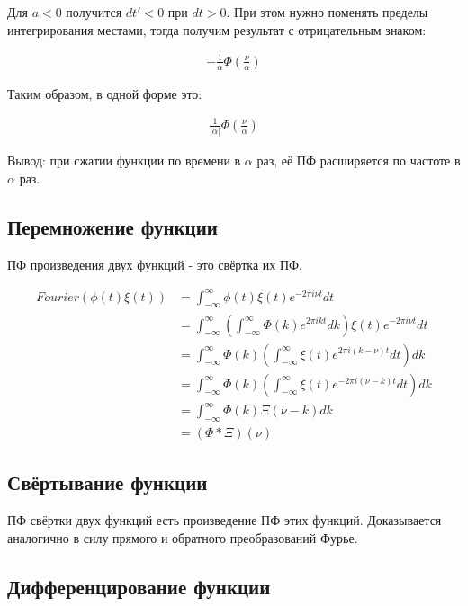 \documentclass[a4paper,12pt]{report}
\begin{document}
Для $a < 0$ получится $dt' < 0$ при $dt > 0$. При этом нужно поменять пределы интегрирования местами, тогда получим результат с отрицательным знаком:

\[
    \begin{aligned}
        -\frac{1}{\alpha} \Phi\left(\frac{\nu}{\alpha}\right)
    \end{aligned}
\]

Таким образом, в одной форме это:

\[
    \begin{aligned}
        \frac{1}{\left|\alpha\right|} \Phi\left(\frac{\nu}{\alpha}\right)
    \end{aligned}
\]

Вывод: при сжатии функции по времени в $\alpha$ раз, её ПФ расширяется по частоте в $\alpha$ раз.

\subsection{Перемножение функции}

ПФ произведения двух функций - это свёртка их ПФ.

\[
    \begin{aligned}
        Fourier\left(\phi(t)\xi(t)\right) 
        &= \int_{-\infty}^{\infty} \phi(t)\xi(t) e^{-2\pi i\nu t} dt \\
        &= \int_{-\infty}^{\infty} \left( \int_{-\infty}^{\infty} \Phi(k) e^{2\pi i kt} dk \right) \xi(t) e^{-2\pi i\nu t} dt \\
        &= \int_{-\infty}^{\infty} \Phi(k) \left( \int_{-\infty}^{\infty} \xi(t) e^{2\pi i (k - \nu)t} dt \right) dk \\
        &= \int_{-\infty}^{\infty} \Phi(k) \left( \int_{-\infty}^{\infty} \xi(t) e^{-2\pi i (\nu - k)t} dt \right) dk \\
        &= \int_{-\infty}^{\infty} \Phi(k) \Xi(\nu - k) dk \\
        &= \left(\Phi * \Xi\right)(\nu)
    \end{aligned}
\]

\subsection{Свёртывание функции}
ПФ свёртки двух функций есть произведение ПФ этих функций. Доказывается аналогично в силу  прямого и обратного преобразований Фурье.

\subsection{Дифференцирование функции}
\end{document}
